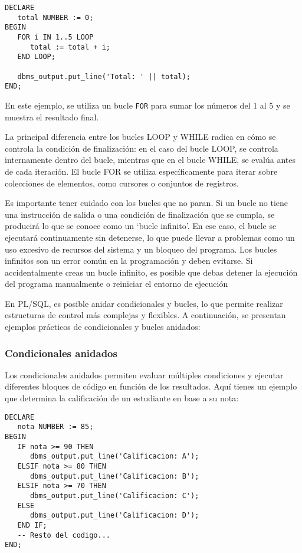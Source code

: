 \documentclass[executivepaper]{article}
\begin{document}
\begin{lstlisting}
DECLARE
   total NUMBER := 0;
BEGIN
   FOR i IN 1..5 LOOP
      total := total + i;
   END LOOP;
   
   dbms_output.put_line('Total: ' || total);
END;
\end{lstlisting}

En este ejemplo, se utiliza un bucle \texttt{FOR} para sumar los números del 1 al 5 y se muestra el resultado final.

La principal diferencia entre los bucles LOOP y WHILE radica en cómo se controla la condición de finalización: en el caso del bucle LOOP, se controla internamente dentro del bucle, mientras que en el bucle WHILE, se evalúa antes de cada iteración. El bucle FOR se utiliza específicamente para iterar sobre colecciones de elementos, como cursores o conjuntos de registros.

Es importante tener cuidado con los bucles que no paran. Si un bucle no tiene una instrucción de salida o una condición de finalización que se cumpla, se producirá lo que se conoce como un \enquote*{bucle infinito}. En ese caso, el bucle se ejecutará continuamente sin detenerse, lo que puede llevar a problemas como un uso excesivo de recursos del sistema y un bloqueo del programa. Los bucles infinitos son un error común en la programación y deben evitarse. Si accidentalmente creas un bucle infinito, es posible que debas detener la ejecución del programa manualmente o reiniciar el entorno de ejecución

En PL/SQL, es posible anidar condicionales y bucles, lo que permite realizar estructuras de control más complejas y flexibles. A continuación, se presentan ejemplos prácticos de condicionales y bucles anidados:

\subsubsection*{Condicionales anidados}

Los condicionales anidados permiten evaluar múltiples condiciones y ejecutar diferentes bloques de código en función de los resultados. Aquí tienes un ejemplo que determina la calificación de un estudiante en base a su nota:

\begin{lstlisting}
DECLARE
   nota NUMBER := 85;
BEGIN
   IF nota >= 90 THEN
      dbms_output.put_line('Calificacion: A');
   ELSIF nota >= 80 THEN
      dbms_output.put_line('Calificacion: B');
   ELSIF nota >= 70 THEN
      dbms_output.put_line('Calificacion: C');
   ELSE
      dbms_output.put_line('Calificacion: D');
   END IF;
   -- Resto del codigo...
END;
\end{lstlisting}
\end{document}
